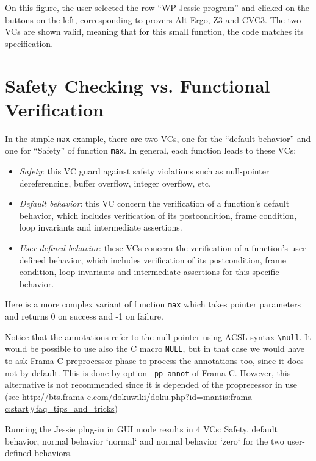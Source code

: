 \documentclass[a4paper,11pt,twoside,openright]{report}
\begin{document}
On this figure, the user selected the row ``WP Jessie program'' and
clicked on the buttons on the left, corresponding to provers Alt-Ergo,
Z3 and CVC3. The two VCs are shown valid, meaning that for this small
function, the code matches its specification.

\section{Safety Checking vs. Functional Verification}

In the simple \verb|max| example, there are two VCs, one for the
``default behavior'' and one for ``Safety'' of function \verb|max|. In
general, each function leads to these VCs:
\begin{itemize}
\item \textit{Safety}: this VC guard against safety violations
  such as null-pointer dereferencing, buffer overflow, integer overflow, etc.
\item \textit{Default behavior}: this VC concern the
  verification of a function's default behavior, which includes
  verification of its postcondition, frame condition, loop invariants
  and intermediate assertions.
\item \textit{User-defined behavior}: these VCs concern the
  verification of a function's user-defined behavior, which includes
  verification of its postcondition, frame condition, loop invariants
  and intermediate assertions for this specific behavior.
\end{itemize}

Here is a more complex variant of function \verb|max| which takes
pointer parameters and returns 0 on success and -1 on failure.



Notice that the annotations refer to the null pointer using ACSL
syntax \verb|\null|. It would be possible to use also the C macro
\texttt{NULL}, but in that case we would have to ask Frama-C
preprocessor phase to process the annotations too, since it does not
by default. This is done by option \verb|-pp-annot| of
Frama-C. However, this alternative is not recommended since it is
depended of the proprecessor in use (see
\url{http://bts.frama-c.com/dokuwiki/doku.php?id=mantis:frama-c:start#faq_tips_and_tricks})

Running the Jessie plug-in in GUI mode results in 4 VCs:
Safety, default behavior, normal behavior `normal` and normal behavior
`zero` for the two user-defined behaviors.
\end{document}
